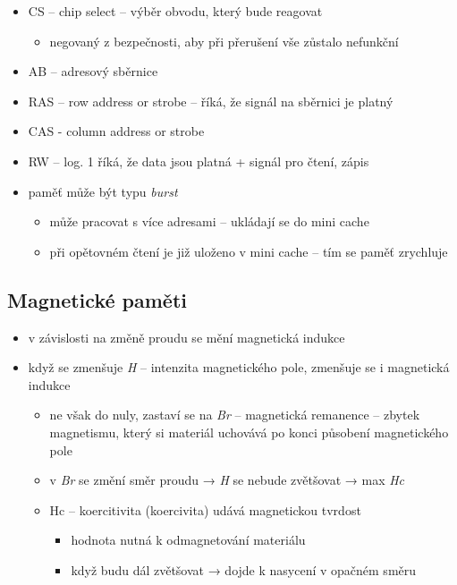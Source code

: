 \documentclass[a4paper,12pt]{article}
\providecommand{\tightlist}{%
\setlength{\itemsep}{0pt}\setlength{\parskip}{0pt}}
\begin{document}
\begin{itemize}
\tightlist
\item CS -- chip select -- výběr obvodu, který bude reagovat

  \begin{itemize}
  \tightlist
  \item negovaný z bezpečnosti, aby při přerušení vše zůstalo nefunkční
  \end{itemize}
\item AB -- adresový sběrnice
\item RAS -- row address or strobe -- říká, že signál na sběrnici je platný
\item CAS - column address or strobe
\item RW -- log. 1 říká, že data jsou platná + signál pro čtení, zápis
\item paměť může být typu \emph{burst}

  \begin{itemize}
  \tightlist
  \item může pracovat s více adresami -- ukládají se do mini cache
  \item při opětovném čtení je již uloženo v mini cache -- tím se paměť
    zrychluje
  \end{itemize}
\end{itemize}

\subsection{Magnetické paměti}

\begin{itemize}
\tightlist
\item v závislosti na změně proudu se mění magnetická indukce
\item když se zmenšuje \emph{H} -- intenzita magnetického pole, zmenšuje se
  i magnetická indukce

  \begin{itemize}
    \tightlist
  \item ne však do nuly, zastaví se na \emph{Br} -- magnetická remanence --
    zbytek magnetismu, který si materiál uchovává po konci působení
    magnetického pole
  \item v \emph{Br} se změní směr proudu → \emph{H} se nebude zvětšovat →
    max \emph{Hc}
  \item Hc -- koercitivita (koercivita) udává magnetickou tvrdost

    \begin{itemize}
    \tightlist
    \item hodnota nutná k odmagnetování materiálu
    \item když budu dál zvětšovat → dojde k nasycení v opačném směru
    \end{itemize}
  \end{itemize}
\end{itemize}
\end{document}
